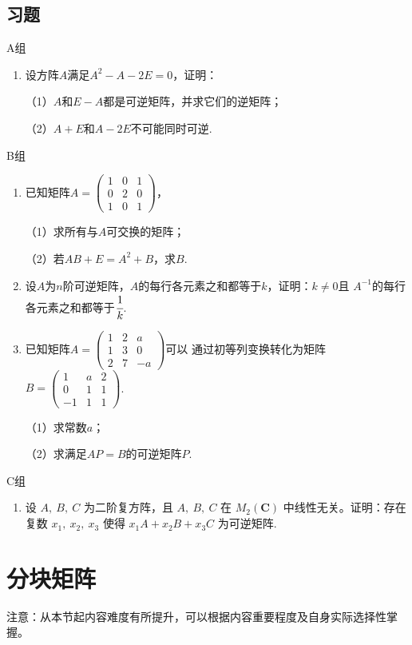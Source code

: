 \subsection{习题}
\centerline{\heiti A组}
\begin{enumerate}
	\item 设方阵$A$满足$A^2-A-2E=0$，证明：
	
	（1）$A$和$E-A$都是可逆矩阵，并求它们的逆矩阵；

	（2）$A+E$和$A-2E$不可能同时可逆.
\end{enumerate}

\centerline{\heiti B组}
\begin{enumerate}
	\item 已知矩阵$A=\begin{pmatrix}
		1 & 0 & 1 \\ 0 & 2 & 0 \\ 1 & 0 & 1
	\end{pmatrix}$，
	
	（1）求所有与$A$可交换的矩阵；

	（2）若$AB+E=A^2+B$，求$B$.
	\item 设$A$为$n$阶可逆矩阵，$A$的每行各元素之和都等于$k$，证明：$k \neq 0$且
	$A^{-1}$的每行各元素之和都等于$\cfrac{1}{k}$.
	\item 已知矩阵$A=\begin{pmatrix}1 & 2 & a \\ 1 & 3 & 0 \\ 2 & 7 & -a\end{pmatrix}$可以
	通过初等列变换转化为矩阵$B=\begin{pmatrix}1 & a & 2 \\ 0 & 1 & 1 \\ -1 & 1 & 1\end{pmatrix}$.

	\textup{（1）}求常数$a$；

	\textup{（2）}求满足$AP=B$的可逆矩阵$P$.
\end{enumerate}
\centerline{\heiti C组}
\begin{enumerate}
	\item 设 $A,\ B,\ C$ 为二阶复方阵，且 $A,\ B,\ C$ 在 $M_2(\mathbf{C})$ 中线性无关。证明：存在复数 $x_1,\ x_2,\ x_3$ 使得 $x_1A+x_2B+x_3C$ 为可逆矩阵.
\end{enumerate}
\section{分块矩阵}
注意：从本节起内容难度有所提升，可以根据内容重要程度及自身实际选择性掌握。
